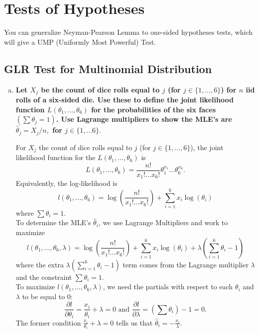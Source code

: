 \newpage

\setcounter{section}{5}
\section{Tests of Hypotheses}

You can generalize Neyman-Pearson Lemma to one-sided hypotheses tests, which will give a UMP (Uniformly Most Powerful) Test.

\setcounter{subsection}{5}
\subsection{GLR Test for Multinomial Distribution}
\graphicspath{{notes/img}}

\begin{enumerate}[a)]
    \item \textbf{Let $X_j$ be the count of dice rolls equal to $j$ (for $j \in \{ 1, \dots, 6 \}$) for $n$ iid rolls of a six-sided die. Use these to define the joint likelihood function $L(\theta_1, \dots, \theta_6)$ for the probabilities of the six faces $(\sum \theta_j = 1)$. Use Lagrange multipliers to show the MLE's are $\hat{\theta}_j = X_j / n,$ for $j \in \{ 1, \dots 6\}.$}  
    
     For $X_j$ the count of dice rolls equal to $j$ (for $j \in \{ 1, \dots, 6 \}$), the joint likelihood function for the $L(\theta_1, \dots, \theta_6)$ is
    \[
        L(\theta_1, \dots, \theta_6) = \frac{n!}{x_1! \dots x_6!}\theta_1^{x_1} \dots \theta_6^{x_6}.
    \]
    Equivalently, the log-likelihood is
    \[
        l(\theta_1, \dots, \theta_6) = \log \left(\frac{n!}{x_1! \dots x_6!}\right) + \sum_{i=1}^6 x_i \log(\theta_i)
    \]
    where $\sum \theta_i = 1$. \\

    To determine the MLE's $\hat{\theta}_i$, we use Lagrange Multipliers and work to maximize
    \[
        l(\theta_1, \dots, \theta_6, \lambda) = \log \left(\frac{n!}{x_1! \dots x_6!}\right) + \sum_{i=1}^6 x_i \log(\theta_i) + \lambda\left(\sum_{i=1}^6 \theta_i - 1\right)
    \]
    where the extra $\lambda(\sum\limits_{i=1}^6 \theta_i - 1)$ term comes from the Lagrange multiplier $\lambda$ and the constraint $\sum \theta_i = 1$. \\
    
    To maximize $l(\theta_1, \dots, \theta_6, \lambda)$, we need the partials with respect
    to each $\theta_i$ and $\lambda$ to be equal to $0$:
    \[
        \frac{\partial l}{\partial \theta_i} = \frac{x_i}{\theta_i} + \lambda = 0 \text{ and } \frac{\partial l}{\partial \lambda} = \left(\sum \theta_i \right) - 1 = 0.
    \]
    The former condition $\frac{x_i}{\theta_i} + \lambda = 0$ tells us that $\hat{\theta}_i = -\frac{x_i}{\lambda}$. \\
    

\end{enumerate}
